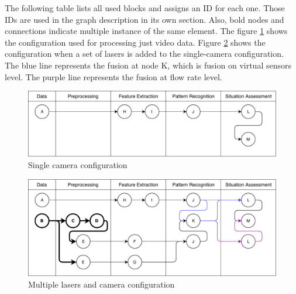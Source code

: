 The following table lists all used blocks and assigns an ID for each one. Those IDs are used in the graph description in its own section. Also, bold nodes and connections indicate multiple instance of the same element. The figure \ref{tconf1} shows the  configuration used for processing just video data. Figure \ref{tconf2} shows the configuration when a set of lasers is added to the single-camera configuration. The blue line represents the fusion at node K, which is fusion on virtual sensors level. The purple line represents the fusion at flow rate level.


\begin{figure}[ht!]
\centering
\includegraphics[scale=0.6]{fig/4/test_configuration1.pdf}
\caption{Single camera configuration}
\label{tconf1}
\end{figure}

\begin{figure}[ht!]
\centering
\includegraphics[scale=0.6]{fig/4/test_configuration2.pdf}
\caption{Multiple lasers and camera configuration}
\label{tconf2}
\end{figure}


%

